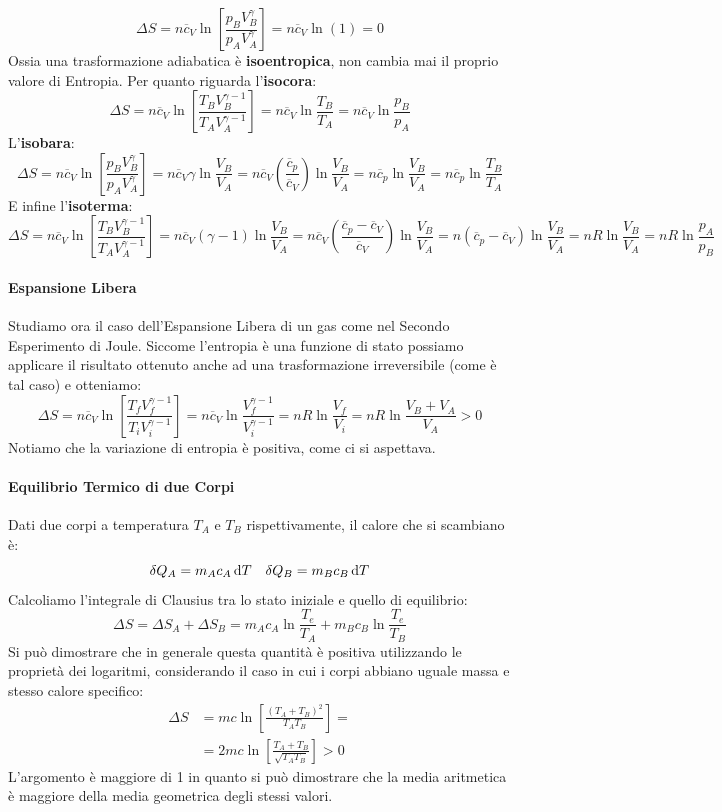 \documentclass{article}
\begin{document}
\[\Delta S=n\overline{c}_V\ln\left[\frac{p_BV_B^{\gamma}}{p_AV_A^{\gamma}}\right]=n\overline{c}_V\ln(1)=0\]
Ossia una trasformazione adiabatica è \textbf{isoentropica}, non cambia mai il proprio valore di Entropia.
Per quanto riguarda l'\textbf{isocora}:
\[\Delta S=n\overline{c}_V\ln\left[\frac{T_BV_B^{\gamma-1}}{T_AV_A^{\gamma-1}}\right]=n\overline{c}_V\ln\frac{T_B}{T_A}=n\overline{c}_V\ln\frac{p_B}{p_A}\]
L'\textbf{isobara}:
\[\Delta S=n\overline{c}_V\ln\left[\frac{p_BV_B^{\gamma}}{p_AV_A^{\gamma}}\right]=n\overline{c}_V\gamma\ln\frac{V_B}{V_A}=n\overline{c}_V(\frac{\overline{c}_p}{\overline{c}_V})\ln\frac{V_B}{V_A}=n\overline{c}_p\ln\frac{V_B}{V_A}=n\overline{c}_p\ln\frac{T_B}{T_A}\]
E infine l'\textbf{isoterma}:
\[\Delta S=n\overline{c}_V\ln\left[\frac{T_BV_B^{\gamma-1}}{T_AV_A^{\gamma-1}}\right]=n\overline{c}_V(\gamma-1)\ln\frac{V_B}{V_A}=n\overline{c}_V(
\frac{\overline{c}_p-\overline{c}_V}{\overline{c}_V})\ln\frac{V_B}{V_A}=n(\overline{c}_p-\overline{c}_V)\ln\frac{V_B}{V_A}=nR\ln\frac{V_B}{V_A}=nR\ln\frac{p_A}{p_B}\]
\paragraph{Espansione Libera}
Studiamo ora il caso dell'Espansione Libera di un gas come nel Secondo Esperimento di Joule. Siccome l'entropia è una funzione di stato possiamo applicare il risultato ottenuto anche ad una trasformazione irreversibile (come è tal caso) e otteniamo:
\begin{equation}
\Delta S=n\overline{c}_V\ln\left[\frac{T_fV_f^{\gamma-1}}{T_iV_i^{\gamma-1}}\right]=n\overline{c}_V\ln\frac{V_f^{\gamma-1}}{V_i^{\gamma-1}}=nR\ln\frac{V_f}{V_i}=nR\ln\frac{V_B+V_A}{V_A}>0
\end{equation}
Notiamo che la variazione di entropia è positiva, come ci si aspettava. 
\paragraph{Equilibrio Termico di due Corpi}
Dati due corpi a temperatura $T_A$ e $T_B$ rispettivamente, il calore che si scambiano è:
\[\delta Q_A=m_Ac_A\dif T\quad\delta Q_B=m_Bc_B\dif T\]
Calcoliamo l'integrale di Clausius tra lo stato iniziale e quello di equilibrio:
\[\Delta S=\Delta S_A+\Delta S_B=m_Ac_A\ln\frac{T_e}{T_A}+m_Bc_B\ln\frac{T_e}{T_B}\]
Si può dimostrare che in generale questa quantità è positiva utilizzando le proprietà dei logaritmi, considerando il caso in cui i corpi abbiano uguale massa e stesso calore specifico:
\begin{equation}
\begin{split}
    \Delta S&=mc\ln\left[\frac{(T_A+T_B)^2}{T_AT_B}\right]=\\
    &=2mc\ln\left[\frac{T_A+T_B}{\sqrt{T_AT_B}}\right]>0
\end{split}
\end{equation}
L'argomento è maggiore di 1 in quanto si può dimostrare che la media aritmetica è maggiore della media geometrica degli stessi valori. 
\end{document}
